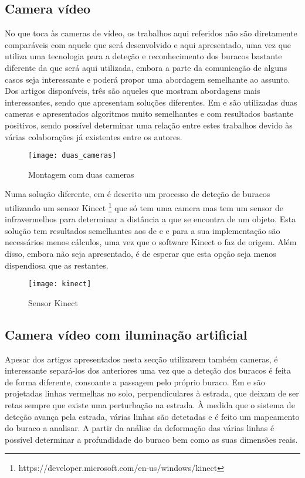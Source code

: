 \subsection{Camera vídeo}
\label{subsec: camera_video}
No que toca às cameras de vídeo, os trabalhos aqui referidos não são diretamente comparáveis com aquele que será desenvolvido e aqui apresentado, uma vez que utiliza uma tecnologia para a deteção e reconhecimento dos buracos bastante diferente da que será aqui utilizada, embora a parte da comunicação de alguns casos seja interessante e poderá propor uma abordagem semelhante ao assunto. Dos artigos disponíveis, três são aqueles que mostram abordagens mais interessantes, sendo que apresentam soluções diferentes. Em \cite{Zhang} e \cite{Chan2014} são utilizadas duas cameras e apresentados algoritmos muito semelhantes e com resultados bastante positivos, sendo possível determinar uma relação entre estes trabalhos devido às várias colaborações já existentes entre os autores.
\begin{figure}[tbp]
	\centering
	\texttt{[image: duas\_cameras]}
	\caption{Montagem com duas cameras}
	\label{fig:montagem_com_duas_cameras}
\end{figure}
Numa solução diferente, em \cite{Moazzam2013} é descrito um processo de deteção de buracos utilizando um sensor Kinect \footnote{https://developer.microsoft.com/en-us/windows/kinect} que só tem uma camera mas tem um sensor de infravermelhos para determinar a distância a que se encontra de um objeto. Esta solução tem resultados semelhantes aos de \cite{Zhang} e \cite{Chan2014} e para a sua implementação são necessários menos cálculos, uma vez que o software Kinect o faz de origem. Além disso, embora não seja apresentado, é de esperar que esta opção seja menos dispendiosa que as restantes.
\begin{figure}[htbp]
	\centering
	\texttt{[image: kinect]}
	\caption{Sensor Kinect}
	\label{fig:sensor_kinect}
\end{figure}

\subsection{Camera vídeo com iluminação artificial}
\label{subsec: camera_video_com_iluminacao_artificial}
Apesar dos artigos apresentados nesta secção utilizarem também cameras, é interessante separá-los dos anteriores uma vez que a deteção dos buracos é feita de forma diferente, consoante a passagem pelo próprio buraco. Em \cite{Yu2011} e \cite{He2011} são projetadas linhas vermelhas no solo, perpendiculares à estrada, que deixam de ser retas sempre que existe uma perturbação na estrada. À medida que o sistema de deteção avança pela estrada, várias linhas são detetadas e é feito um mapeamento do buraco a analisar. A partir da análise da deformação das várias linhas é possível determinar a profundidade do buraco bem como as suas dimensões reais.

